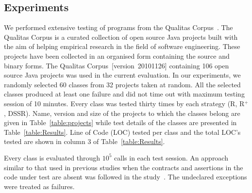 \subsection{Experiments}
We performed extensive testing of programs from the Qualitas Corpus~\cite{tempero2010qualitas}. The Qualitas Corpus is a curated collection of open source Java projects built with the aim of helping empirical research in the field of software engineering. These projects have been collected in an organised form containing the source and binary forms. The Qualitas Corpus~[version~20101126] containing 106 open source Java projects was used in the current evaluation. In our experiments, we randomly selected 60 classes from 32 projects taken at random. All the selected classes produced at least one failure and did not time out with maximum testing session of 10 minutes. Every class was tested thirty times by each strategy (R, R$^+$, DSSR). Name, version and size of the projects to which the classes belong are given in Table~\ref{table:projects} while test details of the classes are presented in Table~\ref{table:Results}. Line of Code (LOC) tested per class and the total LOC's tested are shown in column 3 of Table~\ref{table:Results}. 

Every class is evaluated through $10^5$ calls in each test session. %
An approach similar to that used in previous studies when the contracts and assertions in the code under test are absent was followed in the study~\cite{csallner2004jcrasher, oriol2012random, ducasse2011challenges}. The undeclared exceptions were treated as failures.


